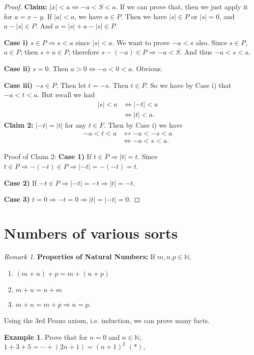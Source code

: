 \documentclass[12pt]{amsbook}
\theoremstyle{plain}
\numberwithin{section}{chapter}
\numberwithin{equation}{chapter}
\theoremstyle{definition}
\newtheorem{Ex}[theorem]{Example}
\theoremstyle{remark}
\newtheorem{rem}[theorem]{Remark}
\theoremstyle{plain}
\newcommand{\n}{\mathbb{N}}
\newcommand{\bee}{\begin{equation}\begin{aligned}}
\newcommand{\eee}{\end{aligned}\end{equation}}
\begin{document}
\begin{proof}
\textbf{Claim:} $|x| < a \Leftrightarrow -a < S < a$. If we can prove that, then we just apply it for $a = x - y$. If $|a| < a$, we have $a \in P$. Then we have $|s| \in P$ or $|s| = 0$, and $a - |s| \in P$. And $a = |s| + a - |s| \in P$.
 
\textbf{Case i)} $s \in P \Rightarrow s < a$ since $|s| < a$. We want to prove $-a < s$ also. Since $s \in P$, $a \in P$, then $s + a \in P$, therefore $s -(-a) \in P \Rightarrow -a < S$. And thus $-a < s < a$. 

\textbf{Case ii)} $s = 0$. Then $a > 0 \Leftrightarrow -a < 0 < a$. Obvious. 

\textbf{Case iii)} $-s \in P$. Then let $t = -s$. Then $t \in P$. So we have by Case i) that $-a < t < a$. But recall we had 
\bee
|s| < a &\Leftrightarrow |-t| < a\\
&\Leftrightarrow |t| < a.
\eee
\textbf{Claim 2:} $|-t| = |t|$ for any $t \in F$. 
Then by Case i) we have
\bee
-a < t < a &\leftrightarrow -a < -s < a\\
&\Leftrightarrow -a < s < a.
\eee

Proof of Claim 2: 
\textbf{Case 1)} If $t \in P \Rightarrow |t| = t$. Since $t \in P \Rightarrow -(-t) \in P \Rightarrow |-t| = -(-t) = t$. 

\textbf{Case 2)} If $-t \in P \Rightarrow |-t| = -t \Rightarrow |t| = -t$. 

\textbf{Case 3)} $t = 0 \Rightarrow -t = 0 \Rightarrow|t| = |-t| = 0$. 
\end{proof}

\section{Numbers of various sorts}


\begin{rem}
\textbf{Properties of Natural Numbers:} If $m,n.p \in \n$,
\begin{enumerate}
\item $(m + n) + p = m + (n + p)$
\item $m + n = n + m$
\item $m + n = m + p \Rightarrow n = p$. 
\end{enumerate}
\end{rem}

Using the 3rd Peano axiom, i.e. induction, we can prove many facts. 

\begin{Ex}
Prove that for $n = 0$ and $n \in \n$, $1 + 3 + 5 = \cdots + (2 n + 1) = (n + 1)^2$ $(*)$,
\end{Ex}
\end{document}
